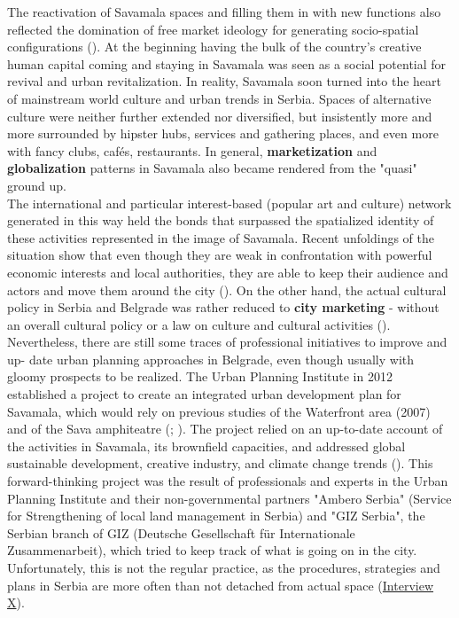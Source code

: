 \documentclass[11pt]{report}
\begin{document}
{{{{The reactivation of Savamala spaces and filling them in with new functions also reflected the domination of free market ideology for generating socio-spatial configurations (\href{ref}{\citealt{world_bank_cities_2000}}). 
At the beginning having the bulk of the country’s creative human capital coming and staying in Savamala was seen as a social potential for revival and urban revitalization. In reality, Savamala soon turned into the heart of mainstream world culture and urban trends in Serbia. Spaces of alternative culture were neither further extended nor diversified, but insistently more and more surrounded by hipster hubs, services and gathering places, and even more with fancy clubs, cafés, restaurants. In general, \textbf{marketization} and \textbf{globalization} patterns in Savamala also became rendered from the "quasi" ground up.
\\

The international and particular interest-based (popular art and culture) network generated in this way held the bonds that surpassed the spatialized identity of these activities represented in the image of Savamala. Recent unfoldings of the situation show that even though they are weak in confrontation with powerful economic interests and local authorities, they are able to keep their audience and actors and move them around the city  (\href{city}{\citealt{jovanovic_dorcol_2016}}).
On the other hand, the actual cultural policy in Serbia and Belgrade was rather reduced to \textbf{city marketing} - without an overall cultural policy or a law on culture and cultural activities (\href{ref}{\citealt{volic_belgrade_2012}}).
\\

Nevertheless, there are still some traces of professional initiatives to improve and up- date urban planning approaches in Belgrade, even though usually with gloomy prospects to be realized. The Urban Planning Institute in 2012 established a project to create an integrated urban development plan for Savamala, which would rely on previous studies of the Waterfront area (2007)
and of the Sava amphiteatre
(\href{Urban1}{\citealt{urbanisticki_zavod_beograda_program_2008}}; \href{Urban2}{\citealt{urbanisticki_zavod_beograda_program_2008-1}}).
The project relied on an up-to-date account of the activities in Savamala, its brownfield capacities, and addressed global sustainable development, creative industry, and climate change trends 
(\href{UZ}{\citealt{urbanisticki_zavod_beograda_integrated_2012}}).
This forward-thinking project was the result of professionals and experts in the Urban Planning Institute and their non-governmental partners "Ambero Serbia" (Service for Strengthening of local land management in Serbia) and "GIZ Serbia", the Serbian branch of GIZ (Deutsche Gesellschaft für Internationale Zusammenarbeit), which tried to keep track of what is going on in the city. Unfortunately, this is not the regular practice, as the procedures, strategies and plans in Serbia are more often than not detached from actual space 
(\href{InterviewX}{Interview X}).
\\

}}}}
\end{document}
